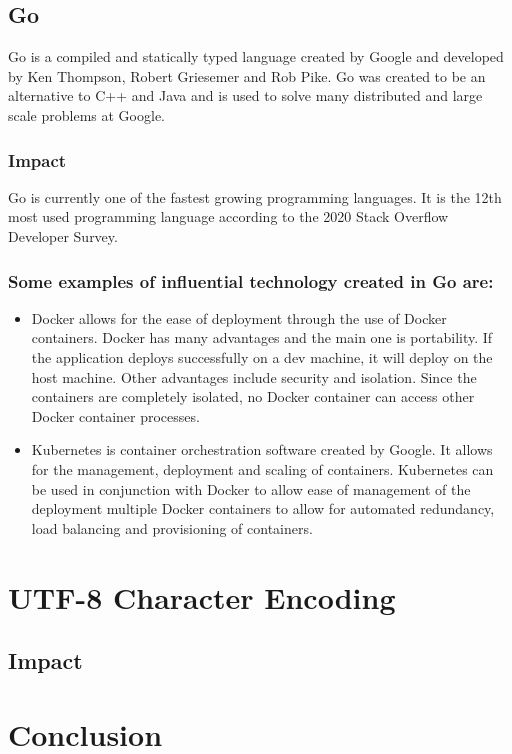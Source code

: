 \documentclass{article}
\begin{document}
\subsection{Go}
Go is a compiled and statically typed language created by Google and developed
by Ken Thompson, Robert Griesemer and Rob Pike. Go was created to be an
alternative to C++ and Java and is used to solve many distributed and large
scale problems at Google.

\subsubsection{Impact}
Go is currently one of the fastest growing programming languages. It is the
12th most used programming language according to the 2020 Stack Overflow
Developer Survey.\cite{dev2020survey}

\subsubsection*{Some examples of influential technology created in Go are:}
\begin{itemize}
  \item Docker allows for the ease of deployment through the use of Docker
    containers. Docker has many advantages and the main one is portability. If
    the application deploys successfully on a dev machine, it will deploy on
    the host machine. Other advantages include security and isolation. Since
    the containers are completely isolated, no Docker container can access
    other Docker container processes.
  \item Kubernetes is container orchestration software created by Google. It
    allows for the management, deployment and scaling of containers. Kubernetes
    can be used in conjunction with Docker to allow ease of management of the
    deployment multiple Docker containers to allow for automated redundancy,
    load balancing and provisioning of containers.
\end{itemize}

\section{UTF-8 Character Encoding}
\subsection{Impact}

\section{Conclusion}



\end{document}
